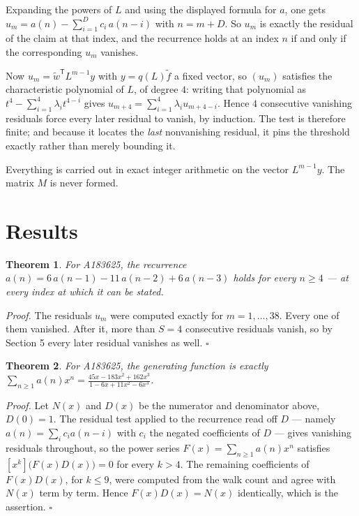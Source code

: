 \documentclass[11pt]{article}
\newtheorem{theorem}{Theorem}
\theoremstyle{definition}
\begin{document}
Expanding the powers of $L$ and using the displayed formula for $a$, one gets $u_m = a(n) - \sum_{i=1}^{D} c_i\,a(n-i)$ with $n = m + D$. So $u_m$ is exactly the residual of the claim at that index, and the recurrence holds at an index $n$ if and only if the corresponding $u_m$ vanishes.

Now $u_m = \tilde w^{\mathsf T} L^{m-1} y$ with $y = q(L)\tilde f$ a fixed vector, so $(u_m)$ satisfies the characteristic polynomial of $L$, of degree $4$: writing that polynomial as $t^{4} - \sum_{i=1}^{4} \lambda_i t^{4-i}$ gives $u_{m+4} = \sum_{i=1}^{4} \lambda_i u_{m+4-i}$. Hence $4$ consecutive vanishing residuals force every later residual to vanish, by induction. The test is therefore finite; and because it locates the {\itshape last} nonvanishing residual, it pins the threshold exactly rather than merely bounding it.

Everything is carried out in exact integer arithmetic on the vector $L^{m-1}y$. The matrix $M$ is never formed.

\section{Results}

\begin{theorem} For A183625, the recurrence $a(n) = 6\,a(n-1) - 11\,a(n-2) + 6\,a(n-3)$ holds for every $n \ge 4$ --- at every index at which it can be stated.\end{theorem}

{\itshape Proof.} The residuals $u_m$ were computed exactly for $m = 1,\dots,38$. Every one of them vanished. After it, more than $S = 4$ consecutive residuals vanish, so by Section 5 every later residual vanishes as well. $\square$

\begin{theorem} For A183625, the generating function is exactly $\sum_{n\ge 1} a(n)x^n = \frac{45x - 183x^{2} + 162x^{3}}{1 - 6x + 11x^{2} - 6x^{3}}$.\end{theorem}

{\itshape Proof.} Let $N(x)$ and $D(x)$ be the numerator and denominator above, $D(0)=1$. The residual test applied to the recurrence read off $D$ --- namely $a(n) = \sum_i c_i a(n-i)$ with $c_i$ the negated coefficients of $D$ --- gives vanishing residuals throughout, so the power series $F(x)=\sum_{n\ge 1}a(n)x^n$ satisfies $[x^k]\bigl(F(x)D(x)\bigr) = 0$ for every $k > 4$. The remaining coefficients of $F(x)D(x)$, for $k \le 9$, were computed from the walk count and agree with $N(x)$ term by term. Hence $F(x)D(x) = N(x)$ identically, which is the assertion. $\square$
\end{document}
